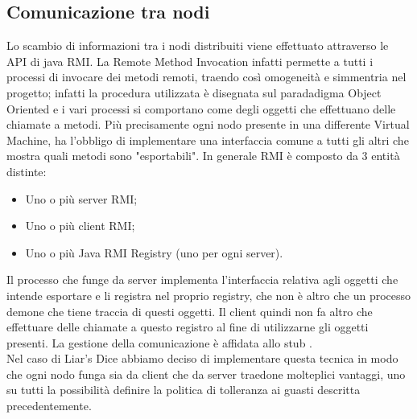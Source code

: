 \documentclass{llncs}
\begin{document}
		\subsection{Comunicazione tra nodi}
			Lo scambio di informazioni tra i nodi distribuiti viene effettuato attraverso le API di java RMI. La Remote Method Invocation infatti permette a tutti i processi di invocare dei metodi remoti, traendo così omogeneità e simmentria nel progetto; infatti la procedura utilizzata è disegnata sul paradadigma Object Oriented e i vari processi si comportano come degli oggetti che effettuano delle chiamate a metodi.
			Più precisamente ogni nodo presente in una differente Virtual Machine, ha 
			l'obbligo di implementare una interfaccia comune a tutti gli altri che mostra quali metodi sono "esportabili". 
			In generale RMI è composto da 3 entità distinte: 
				\begin{itemize}
					\item Uno o più server RMI;
					\item Uno o più client RMI;
					\item Uno o più Java RMI Registry (uno per ogni server).
				\end{itemize}
			Il processo che funge da server implementa l'interfaccia relativa agli oggetti che intende esportare e li registra nel proprio registry, che non è altro che un processo demone che tiene traccia di questi oggetti. Il client quindi non fa altro che effettuare delle chiamate a questo registro al fine di utilizzarne gli oggetti presenti. La gestione della comunicazione è affidata allo stub \cite{rmi}. \\
			Nel caso di Liar's Dice abbiamo deciso di implementare questa tecnica in modo che ogni nodo funga sia da client che da server traedone molteplici vantaggi, uno su tutti la possibilità definire la politica di tolleranza ai guasti descritta precedentemente.
			


	
\end{document}
